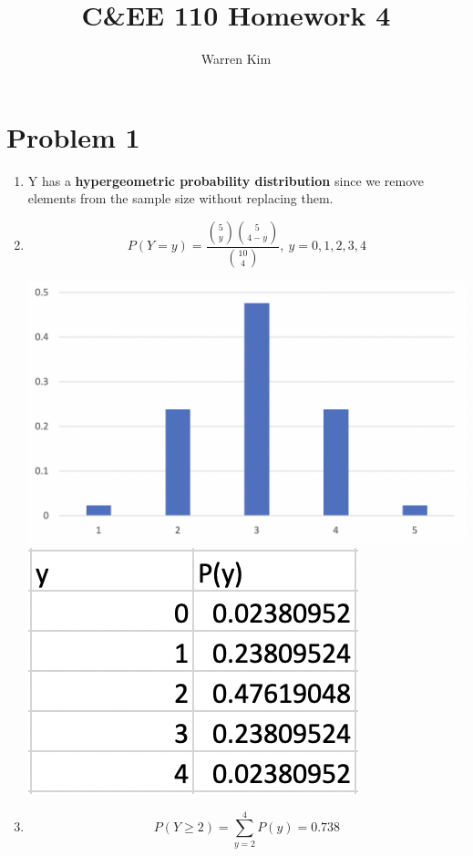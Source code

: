 \documentclass[13pt]{article}
\title{C\&EE 110 Homework 4}
\author{Warren Kim}
\begin{document}
\maketitle

\newpage
\section*{Problem 1}
\begin{enumerate}[label=(\alph*)]
\item Y has a \textbf{hypergeometric probability distribution} since
  we remove elements from the sample size without replacing them.
\item \[P(Y = y) = \frac{ {5 \choose y } { 5 \choose {4 - y} } }{ { 10
        \choose 4 } }, \ y = 0, 1, 2, 3, 4\] 
  \begin{center}
    \includegraphics[scale=0.5]{images/hypergeo.png}
    \includegraphics[scale=1]{images/table.png}
  \end{center}
\item \[P(Y \geq 2) = \sum_{y = 2}^{4} P(y) = 0.738\]
\end{enumerate}
\end{document}
